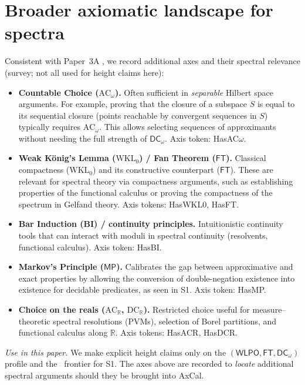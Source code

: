 \documentclass[11pt]{article}
\newcommand{\WLPO}{\mathsf{WLPO}}
\newcommand{\FT}{\mathsf{FT}}
\newcommand{\DCw}{\mathsf{DC}_{\omega}}
\newcommand{\MP}{\mathsf{MP}}
\theoremstyle{plain}
\theoremstyle{definition}
\theoremstyle{remark}
\newcommand{\R}{\mathbb{R}}
\newcommand{\ACw}{\mathrm{AC}_\omega}
\newcommand{\ACR}{\mathrm{AC}_{\mathbb{R}}}
\newcommand{\DCR}{\mathrm{DC}_{\mathbb{R}}}
\newcommand{\WKLz}{\mathrm{WKL}_0}
\begin{document}
\section{Broader axiomatic landscape for spectra}\label{sec:broad-axes}

Consistent with Paper~3A \cite{Paper3A}, we record additional axes and their spectral relevance (survey; not all used for height claims here):

\begin{itemize}
  \item \textbf{Countable Choice ($\ACw$).} Often sufficient in \emph{separable} Hilbert space arguments. For example, proving that the closure of a subspace $S$ is equal to its sequential closure (points reachable by convergent sequences in $S$) typically requires $\ACw$. This allows selecting sequences of approximants without needing the full strength of $\DCw$. Axis token: \textsf{HasAC$\omega$}.
  
  \item \textbf{Weak K\"onig's Lemma ($\WKLz$) / Fan Theorem ($\FT$).} Classical compactness ($\WKLz$) and its constructive counterpart ($\FT$). These are relevant for spectral theory via compactness arguments, such as establishing properties of the functional calculus or proving the compactness of the spectrum in Gelfand theory. Axis tokens: \textsf{HasWKL0}, \textsf{HasFT}.

  \item \textbf{Bar Induction (BI) / continuity principles.} Intuitionistic continuity tools that can interact with moduli in spectral continuity (resolvents, functional calculus). Axis token: \textsf{HasBI}.

  \item \textbf{Markov's Principle ($\MP$).} Calibrates the gap between approximative and exact properties by allowing the conversion of double-negation existence into existence for decidable predicates, as seen in S1. Axis token: \textsf{HasMP}.

  \item \textbf{Choice on the reals ($\ACR$, $\DCR$).} Restricted choice useful for measure--theoretic spectral resolutions (PVMs), selection of Borel partitions, and functional calculus along $\R$. Axis tokens: \textsf{HasACR}, \textsf{HasDCR}.
\end{itemize}

\noindent
\emph{Use in this paper.} We make explicit height claims only on the $(\WLPO,\FT,\DCw)$ profile and the \MP\ frontier for S1.
The axes above are recorded to \emph{locate} additional spectral arguments should they be brought into AxCal.
\end{document}
